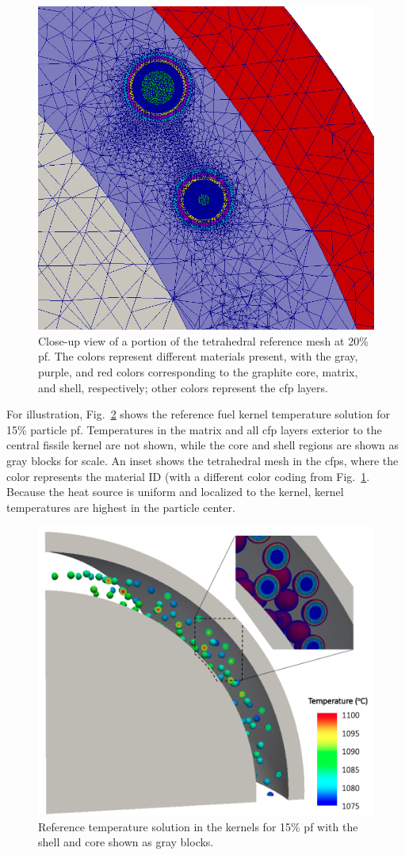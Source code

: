 \begin{figure}[h!]
\centering
\includegraphics[width=0.4\linewidth]{figs/pbfhr_pebble_mesh_cross_section.png}
\caption{Close-up view of a portion of the tetrahedral reference mesh at 20\% \gls{pf}. The colors represent different materials present, with the gray, purple, and red colors corresponding to the graphite core, matrix, and shell, respectively; other colors represent the \gls{cfp} layers.}
\label{fig:pebble_octant_mesh}
\end{figure}

For illustration, Fig.\ \ref{fig:f1} shows the reference fuel kernel temperature solution for 15\% particle \gls{pf}. Temperatures in the matrix and all \gls{cfp} layers exterior to the central fissile kernel are not shown, while the core and shell regions are shown as gray blocks for scale. An inset shows the tetrahedral mesh in the \glspl{cfp}, where the color represents the material ID (with a different color coding from Fig.\ \ref{fig:pebble_octant_mesh}. Because the heat source is uniform and localized to the kernel, kernel temperatures are highest in the particle center.

\begin{figure}[h!]
\centering
\includegraphics[width=0.5\linewidth]{figs/fhr_fuel1.png}
\caption{Reference temperature solution in the kernels for 15\% \gls{pf} with the shell and core shown as gray blocks.}
\label{fig:f1}
\end{figure}

